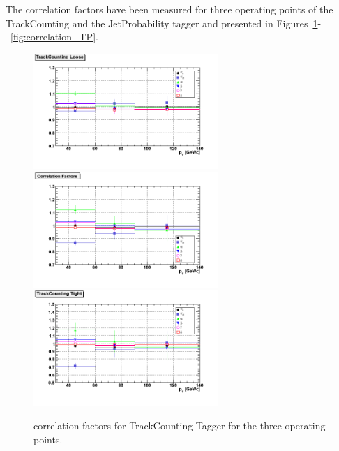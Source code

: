 The correlation factors have been measured for three operating points of the 
TrackCounting and the JetProbability tagger and presented in 
Figures~\ref{fig:correlation_TC}-~\ref{fig:correlation_TP}.


\begin{figure}[htbp]
  \begin{center}
    \includegraphics[width=70mm]{Figures/TCL_correlations_ppmux.png}
    \includegraphics[width=70mm]{Figures/TCM_correlations_ppmux.png}
    \includegraphics[width=70mm]{Figures/TCT_correlations_ppmux.png}
  \end{center}
  \caption{correlation factors for TrackCounting Tagger for the three operating points.}
  \label{fig:correlation_TC}
\end{figure}

